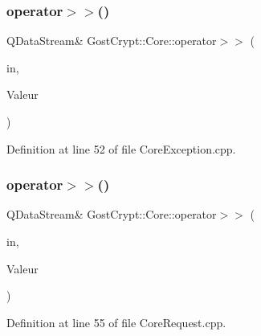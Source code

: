 \mbox{\label{namespace_gost_crypt_1_1_core_a29833970601c0471c393f36eaf6c51d8}} 
\subsubsection{\texorpdfstring{operator$>$$>$()}{operator>>()}\hspace{0.1cm}{\footnotesize\ttfamily [5/56]}}
{\footnotesize\ttfamily Q\+Data\+Stream\& Gost\+Crypt\+::\+Core\+::operator$>$$>$ (\begin{DoxyParamCaption}\item[{Q\+Data\+Stream \&}]{in,  }\item[{\hyperlink{class_gost_crypt_1_1_core_1_1_device_not_mounted}{Gost\+Crypt\+::\+Core\+::\+Device\+Not\+Mounted} \&}]{Valeur }\end{DoxyParamCaption})}



Definition at line 52 of file Core\+Exception.\+cpp.

\mbox{\label{namespace_gost_crypt_1_1_core_a2dd5631efd31de4df2886becbdacc4cb}} 
\subsubsection{\texorpdfstring{operator$>$$>$()}{operator>>()}\hspace{0.1cm}{\footnotesize\ttfamily [6/56]}}
{\footnotesize\ttfamily Q\+Data\+Stream\& Gost\+Crypt\+::\+Core\+::operator$>$$>$ (\begin{DoxyParamCaption}\item[{Q\+Data\+Stream \&}]{in,  }\item[{\hyperlink{struct_gost_crypt_1_1_core_1_1_create_volume_request}{Create\+Volume\+Request} \&}]{Valeur }\end{DoxyParamCaption})}



Definition at line 55 of file Core\+Request.\+cpp.

\mbox{\label{namespace_gost_crypt_1_1_core_a832925d667b756b0c8bf4189ec9c9264}} 

